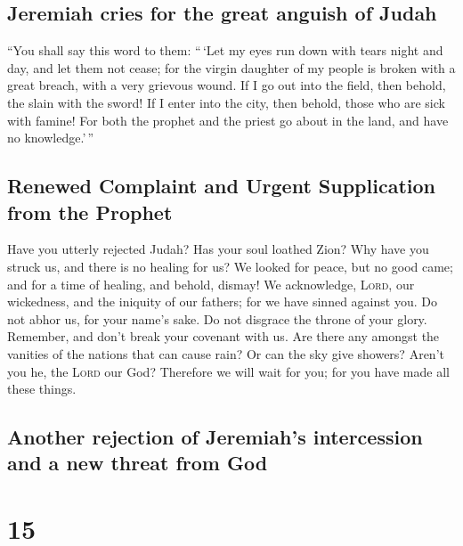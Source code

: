 \hypertarget{jeremiah-cries-for-the-great-anguish-of-judah}{%
\subsection{Jeremiah cries for the great anguish of
Judah}\label{jeremiah-cries-for-the-great-anguish-of-judah}}

 ``You shall say this word to them: ``\,`Let my eyes run
down with tears night and day, and let them not cease; for the virgin
daughter of my people is broken with a great breach, with a very
grievous wound.  If I go out into the field, then behold,
the slain with the sword! If I enter into the city, then behold, those
who are sick with famine! For both the prophet and the priest go about
in the land, and have no knowledge.'\,''

\hypertarget{renewed-complaint-and-urgent-supplication-from-the-prophet}{%
\subsection{Renewed Complaint and Urgent Supplication from the
Prophet}\label{renewed-complaint-and-urgent-supplication-from-the-prophet}}

 Have you utterly rejected Judah? Has your soul loathed
Zion? Why have you struck us, and there is no healing for us? We looked
for peace, but no good came; and for a time of healing, and behold,
dismay!  We acknowledge, \textsc{Lord}, our wickedness,
and the iniquity of our fathers; for we have sinned against you.
 Do not abhor us, for your name's sake. Do not disgrace
the throne of your glory. Remember, and don't break your covenant with
us.  Are there any amongst the vanities of the nations
that can cause rain? Or can the sky give showers? Aren't you he, the
\textsc{Lord} our God? Therefore we will wait for you; for you have made
all these things.

\hypertarget{another-rejection-of-jeremiahs-intercession-and-a-new-threat-from-god}{%
\subsection{Another rejection of Jeremiah's intercession and a new
threat from
God}\label{another-rejection-of-jeremiahs-intercession-and-a-new-threat-from-god}}

\hypertarget{section-14}{%
\section{15}\label{section-14}}


